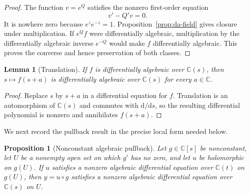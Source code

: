 \documentclass[11pt]{article}
\numberwithin{equation}{section}
\newtheorem{proposition}[theorem]{Proposition}
\newtheorem{lemma}[theorem]{Lemma}
\theoremstyle{definition}
\theoremstyle{remark}
\newcommand{\C}{\mathbb C}
\newcommand{\dd}{\mathrm d}
\begin{document}
\begin{proof}
The function $v=e^Q$ satisfies the nonzero first-order equation
\[
 v'-Q'v=0.
\]
It is nowhere zero because $e^z e^{-z}=1$.  Proposition~\ref{prop:da-field} gives closure under
multiplication.  If $e^Qf$ were differentially algebraic, multiplication by the differentially
algebraic inverse $e^{-Q}$ would make $f$ differentially algebraic.  This proves the converse and
hence preservation of both classes.
\end{proof}

\begin{lemma}[Translation]
\label{lem:translation}
If $f$ is differentially algebraic over $\C(s)$, then $s\mapsto f(s+a)$ is differentially
algebraic over $\C(s)$ for every $a\in\C$.
\end{lemma}

\begin{proof}
Replace $s$ by $s+a$ in a differential equation for $f$.  Translation is an automorphism of
$\C(s)$ and commutes with $\dd/\dd s$, so the resulting differential polynomial is nonzero and
annihilates $f(s+a)$.
\end{proof}

We next record the pullback result in the precise local form needed below.

\begin{proposition}[Nonconstant algebraic pullback]
\label{prop:pullback}
Let $g\in\C[s]$ be nonconstant, let $U$ be a nonempty open set on which $g'$ has no zero, and let
$u$ be holomorphic on $g(U)$.  If $u$ satisfies a nonzero algebraic differential equation over
$\C(t)$ on $g(U)$, then $y=u\circ g$ satisfies a nonzero algebraic differential equation over
$\C(s)$ on $U$.
\end{proposition}
\end{document}
